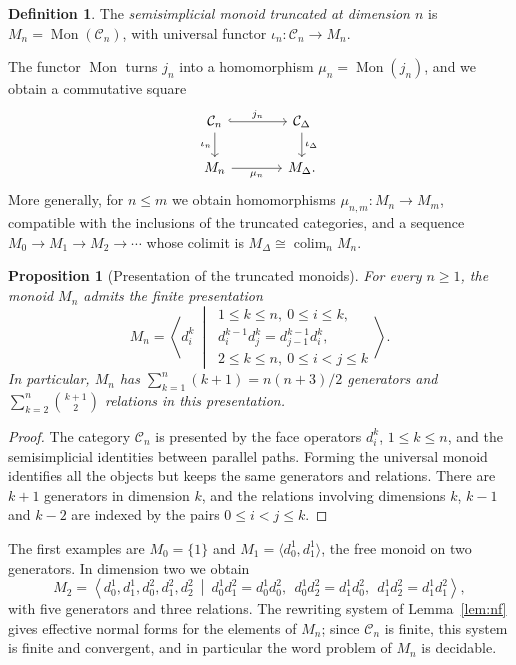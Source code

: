 \documentclass[11pt]{amsart}
\newtheorem{proposition}[teo]{Proposition}
\theoremstyle{definition}
\newtheorem{definition}[teo]{Definition}
\theoremstyle{remark}
\numberwithin{figure}{section}%
\newcommand{\CC}{\mathcal{C}}
\DeclareMathOperator{\Mon}{Mon}
\DeclareMathOperator*{\colim}{colim}
\begin{document}
\begin{definition}
The \emph{semisimplicial monoid truncated at dimension $n$} is $M_n=\Mon(\CC_n)$, with universal functor $\iota_n\colon\CC_n\to M_n$.
\end{definition}

The functor $\Mon$ turns $j_n$ into a homomorphism $\mu_n=\Mon(j_n)$, and we obtain a commutative square
\[
\begin{tikzcd}[column sep=large]
\CC_n \ar[r,hook,"j_n"] \ar[d,"\iota_n"'] & \CC_\Delta \ar[d,"\iota_\Delta"]\\
M_n \ar[r,"\mu_n"'] & M_\Delta.
\end{tikzcd}
\]
More generally, for $n\leq m$ we obtain homomorphisms $\mu_{n,m}\colon M_n\to M_m$, compatible with the inclusions of the truncated categories, and a sequence $M_0\to M_1\to M_2\to\cdots$ whose colimit is $M_\Delta\cong\colim_nM_n$.

\begin{proposition}[Presentation of the truncated monoids]
\label{prop:presentation-Mn}
For every $n\geq1$, the monoid $M_n$ admits the finite presentation
\[
M_n=\left\langle d_i^k\ \middle|\ \begin{array}{l} 1\leq k\leq n,\ 0\leq i\leq k,\\[2pt] d_i^{k-1}d_j^k=d_{j-1}^{k-1}d_i^k,\\[2pt] 2\leq k\leq n,\ 0\leq i<j\leq k\end{array}\right\rangle.
\]
In particular, $M_n$ has $\sum_{k=1}^n(k+1)=n(n+3)/2$ generators and $\sum_{k=2}^n\binom{k+1}{2}$ relations in this presentation.
\end{proposition}

\begin{proof}
The category $\CC_n$ is presented by the face operators $d_i^k$, $1\leq k\leq n$, and the semisimplicial identities between parallel paths. Forming the universal monoid identifies all the objects but keeps the same generators and relations. There are $k+1$ generators in dimension $k$, and the relations involving dimensions $k$, $k-1$ and $k-2$ are indexed by the pairs $0\leq i<j\leq k$.
\end{proof}

The first examples are $M_0=\{1\}$ and $M_1=\langle d_0^1,d_1^1\rangle$, the free monoid on two generators. In dimension two we obtain
\[
M_2=\left\langle d_0^1,d_1^1,d_0^2,d_1^2,d_2^2\ \middle|\ d_0^1d_1^2=d_0^1d_0^2,\ \ d_0^1d_2^2=d_1^1d_0^2,\ \ d_1^1d_2^2=d_1^1d_1^2\right\rangle,
\]
with five generators and three relations. The rewriting system of Lemma~\ref{lem:nf} gives effective normal forms for the elements of $M_n$; since $\CC_n$ is finite, this system is finite and convergent, and in particular the word problem of $M_n$ is decidable.
\end{document}
